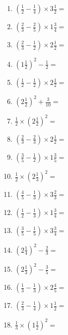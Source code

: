 \documentclass[12pt]{article}
\begin{document}
\begin{enumerate}
\item \large $ \left( \frac{1}{2} - \frac{1}{4} \right) \times 3 \frac{1}{2} = $ \vspace{1.6cm}
\item \large $ \left( \frac{2}{3} - \frac{2}{5} \right) \times 1 \frac{3}{4} = $ \vspace{1.6cm}
\item \large $ \left( \frac{2}{3} - \frac{1}{2} \right) \times 2 \frac{1}{2} = $ \vspace{1.6cm}
\item \large $ \left( 1 \frac{1}{2} \right)^2 - \frac{1}{2} = $ \vspace{1.6cm}
\item \large $ \left( \frac{1}{2} - \frac{1}{2} \right) \times 2 \frac{1}{2} = $ \vspace{1.6cm}
\item \large $ \left( 2 \frac{1}{2} \right)^2 + \frac{3}{10} = $ \vspace{1.6cm}
\item \large $ \frac{1}{2} \times \left( 2 \frac{1}{2} \right)^2 = $ \vspace{1.6cm}
\item \large $ \left( \frac{2}{3} - \frac{2}{3} \right) \times 2 \frac{1}{2} = $ \vspace{1.6cm}
\newpage
\item \large $ \left( \frac{3}{5} - \frac{1}{2} \right) \times 1 \frac{3}{5} = $ \vspace{1.6cm}
\item \large $ \frac{1}{2} \times \left( 2 \frac{1}{3} \right)^2 = $ \vspace{1.6cm}
\item \large $ \left( \frac{4}{5} - \frac{1}{3} \right) \times 3 \frac{2}{3} = $ \vspace{1.6cm}
\item \large $ \left( \frac{1}{2} - \frac{1}{3} \right) \times 1 \frac{3}{4} = $ \vspace{1.6cm}
\item \large $ \left( \frac{3}{5} - \frac{1}{5} \right) \times 3 \frac{3}{4} = $ \vspace{1.6cm}
\item \large $ \left( 2 \frac{1}{4} \right)^2 - \frac{2}{3} = $ \vspace{1.6cm}
\item \large $ \left( 2 \frac{1}{3} \right)^2 - \frac{3}{5} = $ \vspace{1.6cm}
\item \large $ \left( \frac{1}{3} - \frac{1}{3} \right) \times 2 \frac{4}{5} = $ \vspace{1.6cm}
\item \large $ \left( \frac{2}{3} - \frac{1}{4} \right) \times 1 \frac{1}{2} = $ \vspace{1.6cm}
\item \large $ \frac{1}{3} \times \left( 1 \frac{1}{2} \right)^2 = $ \vspace{1.6cm}
\end{enumerate}\newpage
\end{document}
